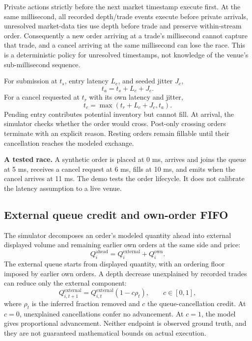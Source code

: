 Private actions strictly before the next market timestamp execute first. At
the same millisecond, all recorded depth/trade events execute before private
arrivals, unresolved market-data ties use depth before trade and preserve
within-stream order. Consequently a new order arriving at a trade's
millisecond cannot capture that trade, and a cancel arriving at the same
millisecond can lose the race. This is a deterministic policy for unresolved
timestamps, not knowledge of the venue's sub-millisecond sequence.

For submission at $t_s$, entry latency $L_e$, and seeded jitter $J_e$,
\begin{equation}
 t_a=t_s+L_e+J_e.
\end{equation}
For a cancel requested at $t_r$ with its own latency and jitter,
\begin{equation}
 t_c=\max(t_r+L_c+J_c,t_a).
\end{equation}
Pending entry contributes potential inventory but cannot fill. At arrival,
the simulator checks whether the order would cross. Post-only crossing orders
terminate with an explicit reason. Resting orders remain fillable until their
cancellation reaches the modeled exchange.

\begin{finding}
\textbf{A tested race.} A synthetic order is placed at 0 ms, arrives and joins
the queue at 5 ms, receives a cancel request at 6 ms, fills at 10 ms, and emits
 when the cancel arrives at 11 ms. The demo tests the
order lifecycle. It does not calibrate the latency assumption to a live venue.
\end{finding}

\subsection{External queue credit and own-order FIFO}

The simulator decomposes an order's modeled quantity ahead into external
displayed volume and remaining earlier own orders at the same side and price:
\begin{equation}
 Q_i^{\mathrm{ahead}}=Q_i^{\mathrm{external}}+Q_i^{\mathrm{own}}.
\end{equation}
The external queue starts from displayed quantity, with an ordering floor
imposed by earlier own orders. A depth decrease unexplained by recorded trades
can reduce only the external component:
\begin{equation}
 Q_{i,t+1}^{\mathrm{external}}
 =Q_{i,t}^{\mathrm{external}}(1-c\rho_t),\qquad c\in[0,1],
\end{equation}
where $\rho_t$ is the inferred fraction removed and $c$ the queue-cancellation
credit. At $c=0$, unexplained cancellations confer no advancement. At $c=1$,
the model gives proportional advancement. Neither endpoint is observed ground
truth, and they are not guaranteed mathematical bounds on actual execution.

